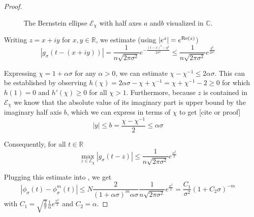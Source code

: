 \begin{proof}
    \begin{figure}[ht]
        \centering
        \caption{The Bernstein ellipse $\mathcal{E}_{\chi}$ with half axes $a$ and$b$ visualized in $\mathbb{C}$.}
        \label{fig:2-chebyshev-proof-bernstein-ellipse}
    \end{figure}

    Writing $z = x + iy$ for $x,y \in \mathbb{R}$, we estimate (using $|e^z| = e^{\operatorname{Re}(z)}$)
    \begin{equation}
        |g_{\sigma}(t - (x + iy))| %
        = \frac{1}{n \sqrt{2 \pi \sigma^2}} e^{- \frac{(t - x)^2 - y^2}{2 \sigma^2}}
        \leq \frac{1}{n \sqrt{2 \pi \sigma^2}} e^{\frac{y^2}{2 \sigma^2}}
    \end{equation}

    Expressing $\chi = 1 + \alpha \sigma$ for any $\alpha > 0$,
    we can estimate $\chi - \chi^{-1} \leq 2\alpha\sigma$.
    This can be established by observing
    $h(\chi) = 2\alpha\sigma - \chi + \chi^{-1} = \chi + \chi^{-1} - 2 \geq 0$
    for which $h(1) = 0$ and $h'(\chi) \geq 0$ for all $\chi > 1$.
    Furthermore, because $z$ is
    contained in $\mathcal{E}_{\chi}$ we know that the absolute value of its
    imaginary part is upper bound by the imaginary half axis $b$, which we can
    express in terms of $\chi$ to get [cite or proof]
    \begin{equation}
        |y| \leq b = \frac{\chi - \chi^{-1}}{2} \leq \alpha\sigma
    \end{equation}

    Consequently, for all $t \in \mathbb{R}$
    \begin{equation}
        \max_{z \in \mathcal{E}_{\chi}} |g_{\sigma}(t - z)| 
        \leq \frac{1}{n \sqrt{2 \pi \sigma^2}} e^{\frac{\alpha^2}{2}}
    \end{equation}

    Plugging this estimate into , we get
    \begin{equation}
        \left| \phi_{\sigma}(t) - \phi_{\sigma}^m(t) \right|
        \leq N \frac{2}{(1 + \alpha\sigma)^m\alpha \sigma} \frac{1}{n \sqrt{2 \pi \sigma^2}} e^{\frac{\alpha^2}{2}}
        = \frac{C_1}{\sigma^2} (1 + C_2 \sigma)^{-m}
    \end{equation}
    with $C_1=\sqrt{\frac{2}{\pi}}\frac{1}{\alpha}e^{\frac{\alpha^2}{2}}$ and $C_2=\alpha$.
\end{proof}

